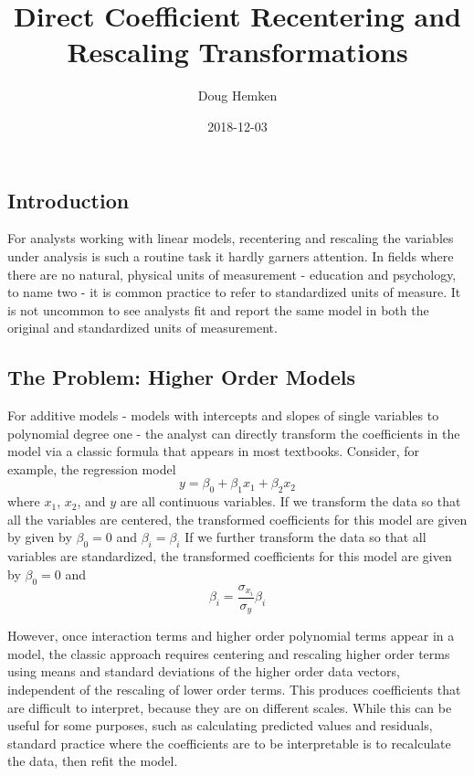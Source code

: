 \documentclass[]{article}
\title{Direct Coefficient Recentering and Rescaling Transformations}
\author{Doug Hemken}
\date{2018-12-03}
\begin{document}
\maketitle

{
\setcounter{tocdepth}{3}
\tableofcontents
}
\subsection{Introduction}\label{introduction}

For analysts working with linear models, recentering and rescaling the
variables under analysis is such a routine task it hardly garners
attention. In fields where there are no natural, physical units of
measurement - education and psychology, to name two - it is common
practice to refer to standardized units of measure. It is not uncommon
to see analysts fit and report the same model in both the original and
standardized units of measurement.

\subsection{The Problem: Higher Order
Models}\label{the-problem-higher-order-models}

For additive models - models with intercepts and slopes of single
variables to polynomial degree one - the analyst can directly transform
the coefficients in the model via a classic formula that appears in most
textbooks. Consider, for example, the regression model
\[y = \beta_0 + \beta_1x_1 + \beta_2x_2\] where \(x_1\), \(x_2\), and
\(y\) are all continuous variables. If we transform the data so that all
the variables are centered, the transformed coefficients for this model
are given by given by \(\beta_0=0\) and \(\beta_i=\beta_i\) If we
further transform the data so that all variables are standardized, the
transformed coefficients for this model are given by \(\beta_0=0\) and
\[\beta_i=\frac{\sigma_{x_i}}{\sigma_y}\beta_i\]

However, once interaction terms and higher order polynomial terms appear
in a model, the classic approach requires centering and rescaling higher
order terms using means and standard deviations of the higher order data
vectors, independent of the rescaling of lower order terms. This
produces coefficients that are difficult to interpret, because they are
on different scales. While this can be useful for some purposes, such as
calculating predicted values and residuals, standard practice where the
coefficients are to be interpretable is to recalculate the data, then
refit the model.
\end{document}
